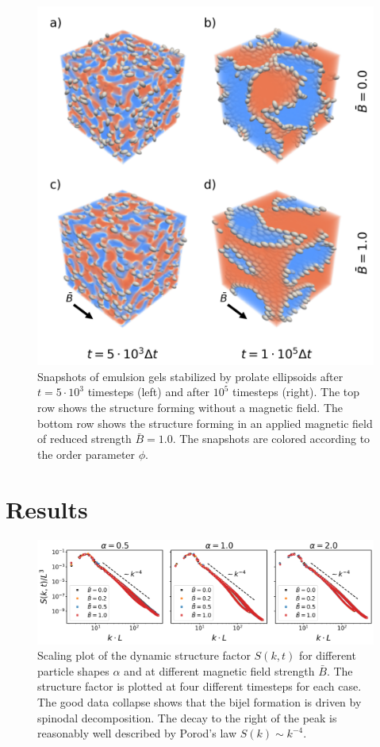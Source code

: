 \begin{figure}
\centering
\includegraphics[width=\columnwidth]{figures/results/paper1/microstructure_viz.png}
\caption{Snapshots of emulsion gels stabilized by prolate ellipsoids after $t=5\cdot10^3$ timesteps (left) and after $10^5$ timesteps (right). The top row shows the structure forming without a magnetic field. The bottom row shows the structure forming in an applied magnetic field of reduced strength $\bar{B}=1.0$. The snapshots are colored according to the order parameter $\phi$.}
\label{fig:microstructure_viz}
\end{figure}

\section{Results}\label{sec:results}

\begin{figure}
\centering
\includegraphics[width=\textwidth]{figures/results/paper1/structure_factor.png}
\caption{Scaling plot of the dynamic structure factor $S(k,t)$ for different particle shapes $\alpha$ and at different magnetic field strength $\bar{B}$. The structure factor is plotted at four different timesteps for each case. The good data collapse shows that the bijel formation is driven by spinodal decomposition. The decay to the right of the peak is reasonably well described by Porod's law $S(k)\sim k^{-4}$.}
\label{fig:structure_factor}
\end{figure}

